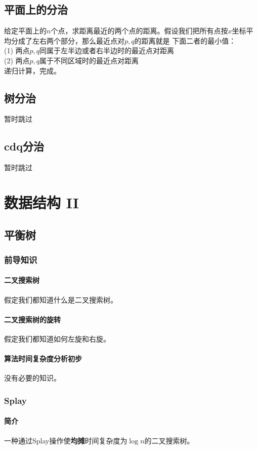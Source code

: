\documentclass[]{cpp}
\begin{document}
\subsection{平面上的分治}
	给定平面上的$n$个点，求距离最近的两个点的距离。假设我们把所有点按$x$坐标平均分成了左右两个部分，那么最近点对$p,q$的距离就是
下面二者的最小值：\\
	(1) 两点$p,q$同属于左半边或者右半边时的最近点对距离\\
	(2) 两点$p,q$属于不同区域时的最近点对距离\\
	递归计算，完成。
\subsection{树分治} 暂时跳过
\subsection{cdq分治} 暂时跳过
\section{数据结构 II}
\subsection{平衡树}
\subsubsection{前导知识}
\paragraph{二叉搜索树} 假定我们都知道什么是二叉搜索树。
\paragraph{二叉搜索树的旋转} 假定我们都知道如何左旋和右旋。
\paragraph{算法时间复杂度分析初步} 没有必要的知识。
\subsubsection{Splay}
\paragraph{简介} 一种通过Splay操作使\textbf{均摊}时间复杂度为$\log{n}$的二叉搜索树。
\end{document}
